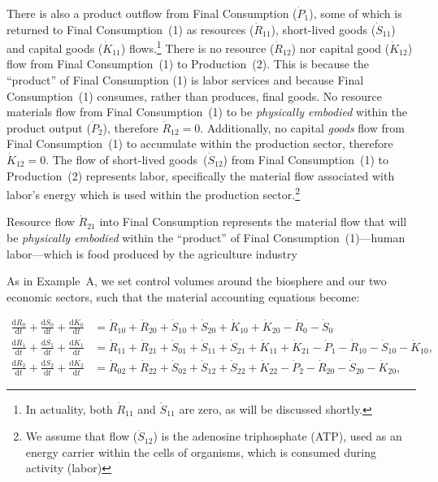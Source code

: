 There is also a product outflow 
from Final Consumption ($\dot{P}_{1}$), 
some of which is returned to Final Consumption~(1)
as resources ($\dot{R}_{11}$), 
short-lived goods ($\dot{S}_{11}$) 
and capital goods ($\dot{K}_{11}$) flows.\footnote{In actuality,
	both $\dot{R}_{11}$ and $\dot{S}_{11}$
	are zero,
	as will be discussed shortly.} 
There is no resource ($\dot{R}_{12}$) nor 
capital good ($\dot{K}_{12}$) flow from 
Final Consumption~(1) to Production~(2).
This is because the ``product'' of Final Consumption (1)
is labor services 
and because Final Consumption~(1) consumes, 
rather than produces, final goods. 
No resource materials flow from Final Consumption~(1) to be 
\emph{physically embodied} 
within the product output ($\dot{P}_{2}$), 
therefore $\dot{R}_{12} = 0$. 
Additionally, no capital \emph{goods} flow 
from Final Consumption~(1) to accumulate
within the production sector, 
therefore $\dot{K}_{12} = 0$.
The flow of short-lived goods~($\dot{S}_{12}$) 
from Final Consumption~(1) to Production~(2)
represents labor,
specifically  the material flow 
associated with labor's energy 
which is used within the production sector.\footnote{We 
	assume that flow ($\dot{S}_{12}$) is the 
	adenosine triphosphate (ATP), 
	used as an energy
	carrier within the cells of organisms,
	which is consumed during activity (labor)
	} 

Resource flow $\dot{R}_{21}$ 
into Final Consumption represents 
the material flow that will be \emph{physically embodied} 
within the ``product'' of Final Consumption~(1)---human labor---which
is food produced by the agriculture industry

As in Example~A, 
we set control volumes around the biosphere
and our two economic sectors, 
such that the material accounting equations become:

\begin{align} 
\label{eq:B_CV_0}
	\frac{\mathrm{d}R_{0}}{\mathrm{d}t} 
	+ \frac{\mathrm{d}S_{0}}{\mathrm{d}t}	
	+ \frac{\mathrm{d}K_0}{\mathrm{d}t}		&
	=  \dot{R}_{10} + \dot{R}_{20} 
	+ \dot{S}_{10} + \dot{S}_{20} 
	+ \dot{K}_{10} + \dot{K}_{20} 
	- \dot{R}_{0} 
	- \dot{S}_{0} 							\\
\label{eq:B_CV_1}
	\frac{\mathrm{d}R_{1}}{\mathrm{d}t} 
	+ \frac{\mathrm{d}S_{1}}{\mathrm{d}t}	
	+ \frac{\mathrm{d}K_{1}}{\mathrm{d}t}	&
	=  \dot{R}_{11} 
	+ \dot{R}_{21}
	+ \dot{S}_{01} 
	+ \dot{S}_{11} 
	+ \dot{S}_{21}
	+ \dot{K}_{11}
	+ \dot{K}_{21}
	- \dot{P}_{1} 
	- \dot{R}_{10} 
	- \dot{S}_{10} 
	- \dot{K}_{10},							\\
\label{eq:B_CV_2}
	\frac{\mathrm{d}R_{2}}{\mathrm{d}t} 
	+ \frac{\mathrm{d}S_{2}}{\mathrm{d}t}
	+ \frac{\mathrm{d}K_{2}}{\mathrm{d}t}	&
	=  \dot{R}_{02} 
	+ \dot{R}_{22} 
	+ \dot{S}_{02} 
	+ \dot{S}_{12} 
	+ \dot{S}_{22} 
	+ \dot{K}_{22}
	- \dot{P}_{2}
	- \dot{R}_{20} 
	- \dot{S}_{20} 
	- \dot{K}_{20},
\end{align}

